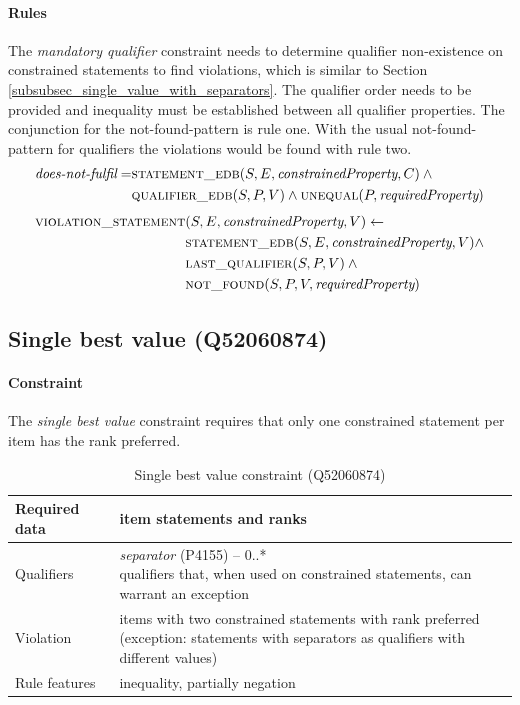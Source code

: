 \documentclass[hyperref,bachelorofscience,fleqn]{cgvpub}
\begin{document}
\paragraph{Rules}
The \emph{mandatory qualifier} constraint needs to determine qualifier non-existence on constrained statements to find violations, which is similar to Section \ref{subsubsec_single_value_with_separators}. The qualifier order needs to be provided and inequality must be established between all qualifier properties. The conjunction for the not-found-pattern is rule one. With the usual not-found-pattern for qualifiers the violations would be found with rule two.
\begin{align}
\begin{split}
\emph{does-not-fulfil} = &\textsc{statement\_edb}(S, E, \emph{constrainedProperty}, C) \wedge{} \\
&\textsc{qualifier\_edb}(S, P, V) \wedge \textsc{unequal}(P, \emph{requiredProperty})
\end{split}
\end{align}
\begin{align}
\begin{split}
\textsc{violation\_statement}&(S, E, \emph{constrainedProperty}, V) \leftarrow \\
&\textsc{statement\_edb}(S, E, \emph{constrainedProperty}, V) \wedge \\
&\textsc{last\_qualifier}(S, P, V) \wedge{} \\
&\textsc{not\_found}(S, P, V, \emph{requiredProperty})
\end{split}
\end{align}

\subsection{Single best value (Q52060874)}\label{subsec_single_best_value}
\paragraph{Constraint}
The \emph{single best value} constraint requires that only one constrained statement per item has the rank preferred.

\begin{table}[H]
\caption{Single best value constraint (Q52060874)}
\begin{tabularx}{\textwidth}{ ll X}
\hline
Required data & item statements and ranks \\
\hline
Qualifiers & \makecell{\emph{separator} (P4155) -- 0..* \\ qualifiers that, when used on constrained statements, can warrant an exception } \\
\hline
Violation & \makecell{items with two constrained statements with rank preferred \\ (exception: statements with separators as qualifiers with different values)} \\
\hline
Rule features & inequality, partially negation \\
\hline
\end{tabularx}
\end{table}
\end{document}
